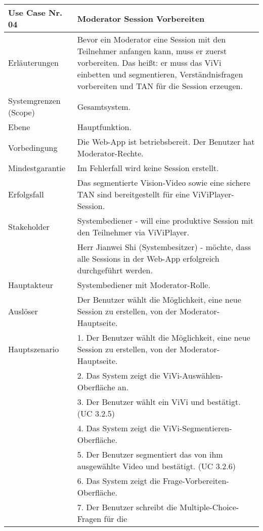 \begin{tabularx}{\linewidth}{|l|X|}
	\hline
	Use Case Nr. 04			& \textbf{Moderator Session Vorbereiten} \\ \hline
	Erläuterungen			& Bevor ein Moderator eine Session mit den Teilnehmer anfangen 
	                          kann, muss er zuerst vorbereiten. Das heißt: er muss das ViVi einbetten und segmentieren, Verständnisfragen vorbereiten und TAN für die Session erzeugen. \\ \hline
	Systemgrenzen (Scope)	& Gesamtsystem. \\ \hline
	Ebene					& Hauptfunktion. \\ \hline
	Vorbedingung			& Die Web-App ist betriebsbereit. Der Benutzer hat 
	                          Moderator-Rechte. \\ \hline
	Mindestgarantie			& Im Fehlerfall wird keine Session erstellt.\\ \hline
	Erfolgsfall  			& Das segmentierte Vision-Video sowie eine sichere TAN sind 
	                          bereitgestellt für eine ViViPlayer-Session. \\ \hline
	Stakeholder				& Systembediener - will eine produktive Session mit den 
	                          Teilnehmer via ViViPlayer. \\
							& Herr Jianwei Shi (Systembesitzer) - möchte, dass alle Sessions 
							  in der Web-App erfolgreich durchgeführt werden. \\ \hline
	Hauptakteur				& Systembediener mit Moderator-Rolle. \\ \hline
	Auslöser				& Der Benutzer wählt die Möglichkeit, eine neue Session zu 
	                          erstellen, von der Moderator-Hauptseite. \\ \hline	
	Hauptszenario			& 1. Der Benutzer wählt die Möglichkeit, eine neue Session zu 
	                          erstellen, von der Moderator-Hauptseite. \\ 
							& 2. Das System zeigt die ViVi-Auswählen-Oberfläche an. \\
							& 3. Der Benutzer wählt ein ViVi und bestätigt. (UC 3.2.5) \\ 
							& 4. Das System zeigt die ViVi-Segmentieren-Oberfläche. \\ 
							& 5. Der Benutzer segmentiert das von ihm ausgewählte Video und 
							  bestätigt. (UC 3.2.6) \\
							& 6. Das System zeigt die Frage-Vorbereiten-Oberfläche. \\
							& 7. Der Benutzer schreibt die Multiple-Choice-Fragen für die 

\end{tabularx}
